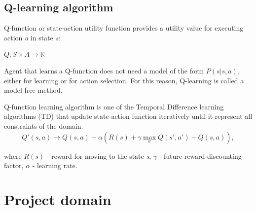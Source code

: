 \documentclass[12pt]{article}
\begin{document}
\subsection{Q-learning algorithm}{
Q-function or state-action utility function provides a utility value for executing action \textit{a} in state \textit{s}:
\begin{center}
$Q:S \times A \to \mathbb{R}$
\end{center}
Agent that learns a Q-function does not need a model of the form $P(s | s, a)$, either for learning or for action selection. For this reason, Q-learning is called a model-free method.\par
Q-function learning algorithm is one of the Temporal Difference learning algorithms (TD) that update state-action function iteratively until it represent all constraints of the domain.
\begin{equation} 
\label{q_update}
Q'(s, a) \rightarrow Q(s, a) + \alpha (R(s) + \gamma \max\limits_a Q(s', a') − Q(s, a)),
\end{equation}

where $R(s)$ - reward for moving to the state \textit{s}, $\gamma$ - future reward discounting factor, $\alpha$ - learning rate. \citep{wiki:q}
}
\newpage
\section{Project domain} 
\end{document}
